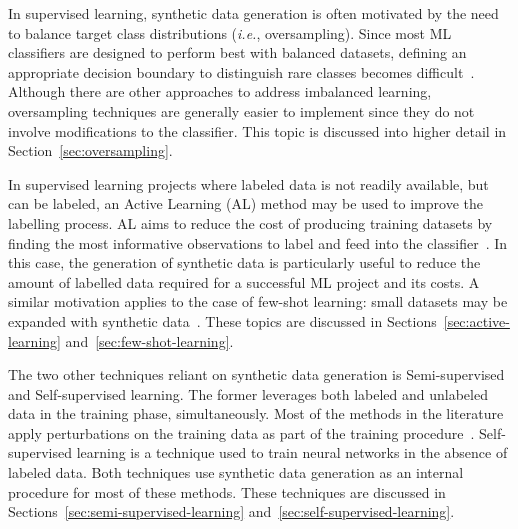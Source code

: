 \documentclass[parskip=full]{scrartcl}
\begin{document}
In supervised learning, synthetic data generation is often motivated by the
need to balance target class distributions (\textit{i.e.}, oversampling).
Since most ML classifiers are designed to perform best with balanced datasets,
defining an appropriate decision boundary to distinguish rare classes becomes
difficult~\cite{saez2016analyzing}. Although there are other approaches to
address imbalanced learning, oversampling techniques are generally easier to
implement since they do not involve modifications to the classifier. This
topic is discussed into higher detail in Section~\ref{sec:oversampling}.

In supervised learning projects where labeled data is not readily available,
but can be labeled, an Active Learning (AL) method may be used to improve the
labelling process. AL aims to reduce the cost of producing training datasets
by finding the most informative observations to label and feed into the
classifier~\cite{fonseca2021increasing}. In this case, the generation of
synthetic data is particularly useful to reduce the amount of labelled data
required for a successful ML project and its costs. A similar motivation
applies to the case of few-shot learning: small datasets may be expanded with
synthetic data~\cite{kumar2019closer}. These topics are discussed in
Sections~\ref{sec:active-learning} and~\ref{sec:few-shot-learning}.

The two other techniques reliant on synthetic data generation is 
Semi-supervised and Self-supervised learning. The former leverages both
labeled and unlabeled data in the training phase, simultaneously. Most of the
methods in the literature apply perturbations on the training data as part of
the training procedure~\cite{van2020survey}. Self-supervised learning is a
technique used to train neural networks in the absence of labeled data. Both
techniques use synthetic data generation as an internal procedure for most of
these methods. These techniques are discussed in
Sections~\ref{sec:semi-supervised-learning}
and~\ref{sec:self-supervised-learning}.



 
 
\end{document}

